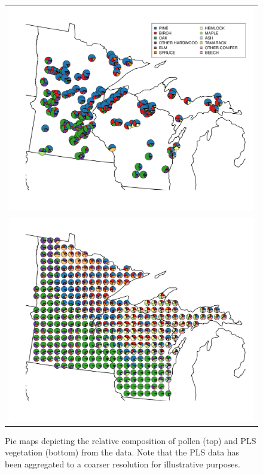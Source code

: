 

\begin{figure}
\centering
\begin{tabular}{c}
\includegraphics[width=5in]{figures/pie_plot_pollen_UMW_v0_3.pdf} \\
\includegraphics[width=5in]{figures/pie_plot_pls_UMW_v0_3.pdf}
\end{tabular}
\caption{Pie maps depicting the relative composition of pollen (top)
  and PLS vegetation (bottom) from the data. Note that the PLS data
  has been aggregated to a coarser resolution for illustrative
  purposes.}
\label{fig:pie}
\end{figure}

